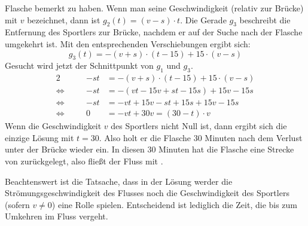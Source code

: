 \begin{exercise}
    Flasche bemerkt zu haben. Wenn man seine Geschwindigkeit (relativ
    zur Brücke) mit $v$ bezeichnet, dann ist $g_{2}(t)=(v-s)\cdot t$.
    Die Gerade $g_{3}$ beschreibt die Entfernung des Sportlers zur Brücke,
    nachdem er auf der Suche nach der Flasche umgekehrt ist. Mit den
    entsprechenden Verschiebungen ergibt sich:
    \begin{equation*}
      g_{3}(t)=-(v+s)\cdot(t-15)+15\cdot(v-s)
    \end{equation*}
    Gesucht wird jetzt der Schnittpunkt von $g_{1}$ und $g_{3}$.
    \newcommand{\aq}{\Leftrightarrow}%
    \begin{alignat*}{2}
         &\quad & -st&=-(v+s)\cdot(t-15)+15\cdot(v-s) \\
      \aq&\quad & -st&=-(vt-15v+st-15s)+15v-15s \\
      \aq&\quad & -st&=-vt+15v-st+15s+15v-15s \\
      \aq&\quad &   0&=-vt+30v=(30-t)\cdot v
    \end{alignat*}
    Wenn die Geschwindigkeit $v$ des Sportlers nicht Null ist,
    dann ergibt sich die einzige Lösung mit $t=30$. Also holt
    er die Flasche 30 Minuten nach dem Verlust unter der Brücke
    wieder ein.
    In diesen 30 Minuten hat die Flasche eine Strecke von 
    zurückgelegt, also fließt der Fluss mit .\par
    Beachtenswert ist die Tatsache, dass in der Lösung werder die Strömungsgeschwindigkeit
    des Flusses noch die Geschwindigkeit des Sportlers (sofern $v\neq0$) eine Rolle spielen.
    Entscheidend ist lediglich die Zeit, die bis zum Umkehren im Fluss vergeht.
  \fi
\end{exercise}
